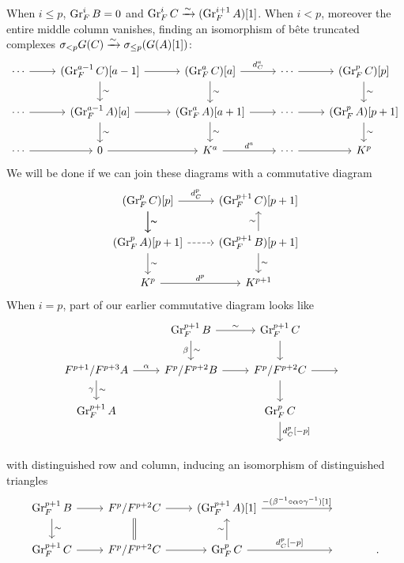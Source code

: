 \documentclass[deligne.tex]{subfiles}
\begin{document}
When $i\leq p$, $\operatorname{Gr}_F^iB=0$ and $\operatorname{Gr}^i_FC\xrightarrow\sim(\operatorname{Gr}_F^{i+1}A)[1]$.
When $i<p$, moreover the entire middle column vanishes, finding an
isomorphism of bête truncated complexes
$\sigma_{<p}G(C)\xrightarrow\sim\sigma_{\leq p}(G(A)[1])$: 
\begin{equation*}\begin{tikzcd}
	\cdots\arrow[r]&(\Gr_F^{a-1}C)[a-1]\arrow[r]\arrow[d,"\sim"]
	&(\Gr_F^{a}C)[a]\arrow[r,"d_C^a"]\arrow[d,"\sim"]
	&\cdots\arrow[r]&(\Gr_F^{p}C)[p]\arrow[d,"\sim"] \\
	\cdots\arrow[r]&(\Gr_F^{a-1}A)[a]\arrow[r]\arrow[d,"\sim"]
	&(\Gr_F^{a}A)[a+1]\arrow[r]\arrow[d,"\sim"]
	&\cdots\arrow[r]&(\Gr_F^{p}A)[p+1]\arrow[d,"\sim"] \\
	\cdots\arrow[r]&0\arrow[r]
	&K^a\arrow[r,"{d^a}"]&\cdots\arrow[r]&K^p
\end{tikzcd}\end{equation*}
We will be done if we can join these diagrams with a commutative diagram
\begin{equation*}\begin{tikzcd}
	(\Gr_F^{p}C)[p]\arrow[d,"\sim"]\arrow[r,"d_C^p"]\arrow[d,"\sim"]
	&(\Gr_F^{p+1}C)[p+1] \\
	(\Gr_F^{p}A)[p+1]\arrow[d,"\sim"]\arrow[r,dashed]
	&(\Gr_F^{p+1}B)[p+1]\arrow[d,"\sim"]\arrow[u,"\sim"] \\
	K^p\arrow[r,"d^p"]&K^{p+1}
\end{tikzcd}\end{equation*}
When $i=p$, part of our earlier commutative diagram looks like
\begin{equation*}\begin{tikzcd}
	&\Gr_F^{p+1}B\arrow[r,"\sim"]\arrow[d,"\sim","\beta"']
	&\Gr_F^{p+1}C\arrow[d] \\
	F^{p+1}/F^{p+3}A\arrow[r,"\alpha"]\arrow[d,"\sim", "\gamma"']
	&F^p/F^{p+2}B\arrow[r]
	&F^p/F^{p+2}C\arrow[r]\arrow[d]&\; \\
	\Gr_F^{p+1}A&&\Gr_F^pC\arrow[d,"{d_C^p[-p]}"] \\ &&\;
\end{tikzcd}\end{equation*}
with distinguished row and column, inducing an isomorphism of 
distinguished triangles
\begin{equation*}\begin{tikzcd}
	\Gr^{p+1}_FB\arrow[r]\arrow[d,"\sim"]
	&F^p/F^{p+2}C\arrow[d,equals]\arrow[r]
	&(\Gr_F^{p+1}A)[1]\arrow[r,"{-(\beta^{-1}\circ\alpha\circ\gamma^{-1})[1]}"]&[40pt]\;&\; \\
	\Gr_F^{p+1}C\arrow[r]&F^p/F^{p+2}C\arrow[r]
	&\Gr_F^pC\arrow[u,"\sim"]\arrow[r,"{d_C^p[-p]}"]&\;&.
\end{tikzcd}\end{equation*}
\end{document}

